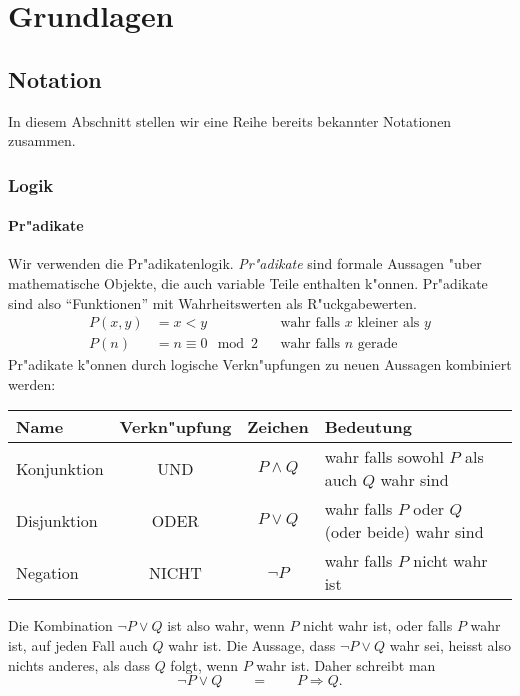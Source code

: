 %
%
%
\chapter{Grundlagen\label{chapter-grundlagen}}
\section{Notation}
In diesem Abschnitt stellen wir eine Reihe bereits bekannter Notationen
zusammen.
\subsection{Logik}
\subsubsection{Pr"adikate}
Wir verwenden die Pr"adikatenlogik.
{\em Pr"adikate} sind formale Aussagen "uber mathematische Objekte, die auch
variable Teile enthalten k"onnen. Pr"adikate sind also ``Funktionen'' mit
Wahrheitswerten als R"uckgabewerten.
\begin{align*}
P(x,y)&=x < y&&\text{wahr falls $x$ kleiner als $y$}\\
P(n)&=n \equiv 0\mod 2&&\text{wahr falls $n$ gerade}
\end{align*}
Pr"adikate k"onnen durch logische Verkn"upfungen zu neuen Aussagen kombiniert
werden:
\begin{center}
\begin{tabular}{|l|c|c|l|}
\hline
Name&Verkn"upfung&Zeichen&Bedeutung\\
\hline
\index{Konjunktion}
Konjunktion&UND&$P\wedge Q$&wahr falls sowohl $P$ als auch $Q$ wahr sind\\
\index{Disjunktion}
Disjunktion&ODER&$P\vee Q$&wahr falls $P$ oder $Q$ (oder beide) wahr sind\\
\index{Negation}
Negation&NICHT&$\neg P$&wahr falls $P$ nicht wahr ist\\
\hline
\end{tabular}
\end{center}
Die Kombination $\neg P\vee Q$ ist also wahr, wenn $P$ nicht
wahr ist, oder falls $P$ wahr ist, auf jeden Fall auch $Q$
wahr ist. Die Aussage, dass $\neg P\vee Q$ wahr sei, heisst also
nichts anderes, als dass $Q$ folgt, wenn $P$ wahr ist. Daher schreibt
man
\[
\neg P\vee Q\qquad =\qquad P\Rightarrow Q.
\]

